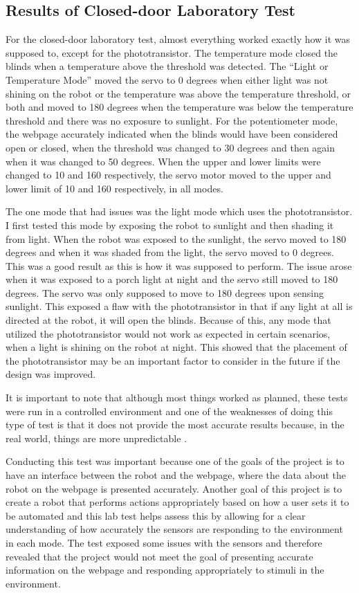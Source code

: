\documentclass[10pt,twocolumn]{article}
\begin{document}
\subsection{Results of Closed-door Laboratory Test}
For the closed-door laboratory test, almost everything worked exactly how it was supposed to, except for the phototransistor. The temperature mode closed the blinds when a temperature above the threshold was detected. The “Light or Temperature Mode” moved the servo to 0 degrees when either light was not shining on the robot or the temperature was above the temperature threshold, or both and moved to 180 degrees when the temperature was below the temperature threshold and there was no exposure to sunlight. For the potentiometer mode, the webpage accurately indicated when the blinds would have been considered open or closed, when the threshold was changed to 30 degrees and then again when it was changed to 50 degrees. When the upper and lower limits were changed to 10 and 160 respectively, the servo motor moved to the upper and lower limit of 10 and 160 respectively, in all modes.

The one mode that had issues was the light mode which uses the phototransistor. I first tested this mode by exposing the robot to sunlight and then shading it from light. When the robot was exposed to the sunlight, the servo moved to 180 degrees and when it was shaded from the light, the servo moved to 0 degrees. This was a good result as this is how it was supposed to perform. The issue arose when it was exposed to a porch light at night and the servo still moved to 180 degrees. The servo was only supposed to move to 180 degrees upon sensing sunlight. This exposed a flaw with the phototransistor in that if any light at all is directed at the robot, it will open the blinds. Because of this, any mode that utilized the phototransistor would not work as expected in certain scenarios, when a light is shining on the robot at night. This showed that the placement of the phototransistor may be an important factor to consider in the future if the design was improved. 

It is important to note that although most things worked as planned, these tests were run in a controlled environment and one of the weaknesses of doing this type of test is that it does not provide the most accurate results because, in the real world, things are more unpredictable \cite{Muler2016Designing}.

Conducting this test was important because one of the goals of the project is to have an interface between the robot and the webpage, where the data about the robot on the webpage is presented accurately. Another goal of this project is to create a robot that performs actions appropriately based on how a user sets it to be automated and this lab test helps assess this by allowing for a clear understanding of how accurately the sensors are responding to the environment in each mode. The test exposed some issues with the sensors and therefore revealed that the project would not meet the goal of presenting accurate information on the webpage and responding appropriately to stimuli in the environment. 
\end{document}

